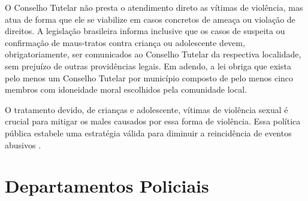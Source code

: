
O Conselho Tutelar não presta o atendimento direto as vítimas de violência, mas atua de forma que ele se viabilize em casos concretos de ameaça ou violação de direitos. A legislação brasileira informa inclusive que os casos de suspeita ou confirmação de maus-tratos contra criança ou adolescente devem, obrigatoriamente, ser comunicados ao Conselho Tutelar da respectiva localidade, sem prejuízo de outras providências legais. Em adendo, a lei obriga que exista pelo menos um Conselho Tutelar por município composto de pelo menos cinco membros com idoneidade moral escolhidos pela comunidade local. 

O tratamento devido, de crianças e adolescente, vítimas de violência sexual é crucial para mitigar os males causados por essa forma de violência. Essa política pública estabele uma estratégia válida para diminuir a reincidência de eventos abusivos \cite{costa2019maus}.





\section{Departamentos Policiais}\label{sec:dp}%

